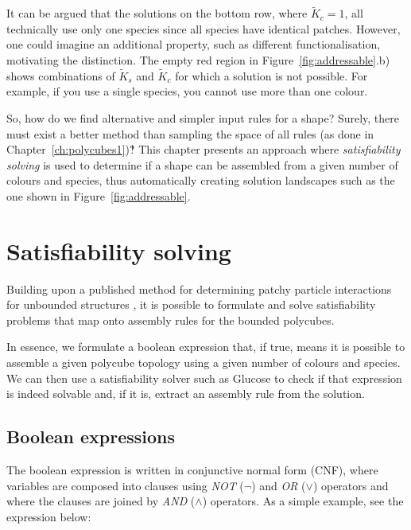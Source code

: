 It can be argued that the solutions on the bottom row, where \(\widetilde{K}_c=1\), all technically use only one species since all species have identical patches. However, one could imagine an additional property, such as different functionalisation, motivating the distinction. The empty red region in Figure~\ref{fig:addressable}.b) shows combinations of \(\widetilde{K}_s\) and \(\widetilde{K}_c\) for which a solution is not possible. For example, if you use a single species, you cannot use more than one colour.



So, how do we find alternative and simpler input rules for a shape? Surely, there must exist a better method than sampling the space of all rules (as done in Chapter~\ref{ch:polycubes1})‽ This chapter presents an approach where \emph{satisfiability solving} is used to determine if a shape can be assembled from a given number of colours and species, thus automatically creating solution landscapes such as the one shown in Figure~\ref{fig:addressable}.


\section{Satisfiability solving}

Building upon a published method for determining patchy particle interactions for unbounded structures \cite{romano2020designing}, it is possible to formulate and solve satisfiability problems that map onto assembly rules for the bounded polycubes.

In essence, we formulate a boolean expression that, if true, means it is possible to assemble a given polycube topology using a given number of colours and species. We can then use a satisfiability solver such as Glucose \cite{audemard2009glucose, imms-sat18} to check if that expression is indeed solvable and, if it is, extract an assembly rule from the solution.

\subsection{Boolean expressions}

The boolean expression is written in conjunctive normal form (CNF), where variables are composed into clauses using \emph{NOT} (\(\lnot\)) and \emph{OR} (\(\lor\)) operators and where the clauses are joined by \emph{AND} (\(\land\)) operators. As a simple example, see the expression below:

